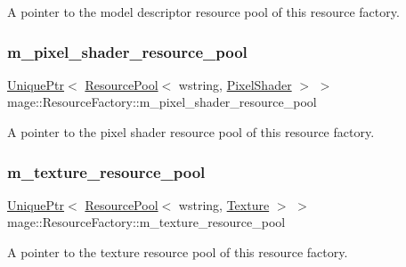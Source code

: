 A pointer to the model descriptor resource pool of this resource factory. \hypertarget{classmage_1_1_resource_factory_a987af631d0fda02fd336ceb02113a128}{}\label{classmage_1_1_resource_factory_a987af631d0fda02fd336ceb02113a128} 
\subsubsection{\texorpdfstring{m\+\_\+pixel\+\_\+shader\+\_\+resource\+\_\+pool}{m\_pixel\_shader\_resource\_pool}}
{\footnotesize\ttfamily \hyperlink{namespacemage_a8c307fbcc33bce9b7f2aa4c26c3b95cf}{Unique\+Ptr}$<$ \hyperlink{classmage_1_1_resource_pool}{Resource\+Pool}$<$ wstring, \hyperlink{classmage_1_1_pixel_shader}{Pixel\+Shader} $>$ $>$ mage\+::\+Resource\+Factory\+::m\+\_\+pixel\+\_\+shader\+\_\+resource\+\_\+pool\hspace{0.3cm}{\ttfamily [private]}}

A pointer to the pixel shader resource pool of this resource factory. \hypertarget{classmage_1_1_resource_factory_a0bb6251c64ac1f5e9de04968f9d78e57}{}\label{classmage_1_1_resource_factory_a0bb6251c64ac1f5e9de04968f9d78e57} 
\subsubsection{\texorpdfstring{m\+\_\+texture\+\_\+resource\+\_\+pool}{m\_texture\_resource\_pool}}
{\footnotesize\ttfamily \hyperlink{namespacemage_a8c307fbcc33bce9b7f2aa4c26c3b95cf}{Unique\+Ptr}$<$ \hyperlink{classmage_1_1_resource_pool}{Resource\+Pool}$<$ wstring, \hyperlink{classmage_1_1_texture}{Texture} $>$ $>$ mage\+::\+Resource\+Factory\+::m\+\_\+texture\+\_\+resource\+\_\+pool\hspace{0.3cm}{\ttfamily [private]}}

A pointer to the texture resource pool of this resource factory. \hypertarget{classmage_1_1_resource_factory_a78b0848a3aa92c338d2bc209996dd649}{}\label{classmage_1_1_resource_factory_a78b0848a3aa92c338d2bc209996dd649} 
